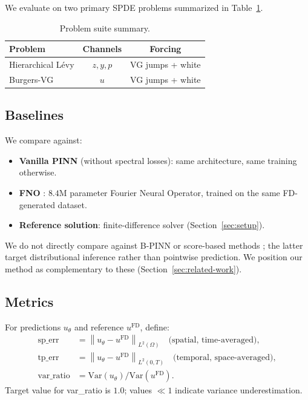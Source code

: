 \documentclass[times,12pt]{elsarticle}
\newcommand{\norm}[1]{\left\|#1\right\|}
\newcommand{\Var}{\mathrm{Var}}
\begin{document}
We evaluate on two primary SPDE problems summarized in Table~\ref{tab:problems}.

\begin{table}[h]
\centering
\caption{Problem suite summary.}
\label{tab:problems}
\begin{tabular}{lcc}
\toprule
Problem & Channels & Forcing \\
\midrule
Hierarchical L\'evy & $z, y, p$ & VG jumps + white \\
Burgers-VG & $u$ & VG jumps + white \\
\bottomrule
\end{tabular}
\end{table}

\subsection{Baselines}

We compare against:
\begin{itemize}
    \item \textbf{Vanilla PINN} (without spectral losses): same architecture, same training otherwise.
    \item \textbf{FNO} \cite{Li2021FNO}: $8.4$M parameter Fourier Neural Operator, trained on the same FD-generated dataset.
    \item \textbf{Reference solution}: finite-difference solver (Section~\ref{sec:setup}).
\end{itemize}

We do not directly compare against B-PINN \cite{YangMengKarniadakis2021} or score-based methods \cite{Hu2024ScoreFPINN}; the latter target distributional inference rather than pointwise prediction. We position our method as complementary to these (Section~\ref{sec:related-work}).

\subsection{Metrics}

For predictions $u_\theta$ and reference $u^{\text{FD}}$, define:
\begin{align*}
\text{sp\_err} &= \norm{u_\theta - u^{\text{FD}}}_{L^2(\Omega)} \quad\text{(spatial, time-averaged)}, \\
\text{tp\_err} &= \norm{u_\theta - u^{\text{FD}}}_{L^2(0,T)} \quad\text{(temporal, space-averaged)}, \\
\text{var\_ratio} &= \Var(u_\theta) / \Var(u^{\text{FD}}).
\end{align*}
Target value for var\_ratio is $1.0$; values $\ll 1$ indicate variance underestimation.
\end{document}
